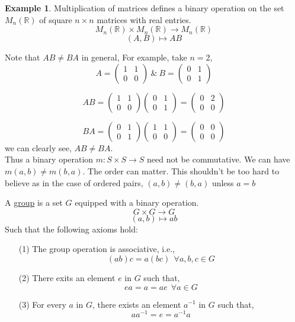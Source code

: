 \documentclass{article}
\theoremstyle{definition}
\newtheorem*{example}{Example}\theoremstyle{definition}
\begin{document}
\begin{example}
    Multiplication of matrices defines a binary operation on the set $M_n(\mathbb{R})$ of square $n\times n$ matrices with real entries.
    $$M_n(\mathbb{R})\times M_n(\mathbb{R})\to M_n(\mathbb{R})$$
    $$(A,B)\mapsto AB$$

    Note that $AB\neq BA$ in general, For example, take $n=2$,
    $$A=\left(\begin{array}{cc}
        1&1\\
        0&0
    \end{array}\right) \ \& \ B=\left(\begin{array}{cc}
        0&1\\
        0&1
    \end{array}\right)$$

    $$AB=\left(\begin{array}{cc}
        1&1\\
        0&0
    \end{array}\right)\left(\begin{array}{cc}
        0&1\\
        0&1
    \end{array}\right)=\left(\begin{array}{cc}
        0&2\\
        0&0
    \end{array}\right)$$

    $$BA=\left(\begin{array}{cc}
        0&1\\
        0&1
    \end{array}\right)\left(\begin{array}{cc}
        1&1\\
        0&0
    \end{array}\right)=\left(\begin{array}{cc}
        0&0\\
        0&0
    \end{array}\right)$$
    we can clearly see, $AB\neq BA$.\\
    Thus a binary operation $m:S\times S\to S$ need not be commutative. We can have $m(a,b)\neq m(b,a)$. The order can matter. This shouldn't be too hard to believe as in the case of ordered pairs, $(a,b)\neq(b,a)$ unless $a=b$
\end{example}
\begin{tcolorbox} [title= Definition:, colback=black!10!white]
    A \underline{group} is a set $G$ equipped with a binary operation.
    $$G\times G\to G$$
    $$(a,b)\mapsto ab$$
    Such that the following axioms hold:
    \begin{enumerate}
        \item[(1)] The group operation is associative, i.e.,
        $$(ab)c=a(bc) \ \ \forall a,b,c\in G$$
        \item[(2)] There exits an element $e$ in $G$ such that,
        $$ea=a=ae \ \ \forall a\in G$$ 
        \item[(3)] For every $a$ in $G$, there exists an element $a^{-1}$ in $G$ such that,
        $$aa^{-1}=e=a^{-1}a$$
    \end{enumerate}
\end{tcolorbox}
\end{document}
